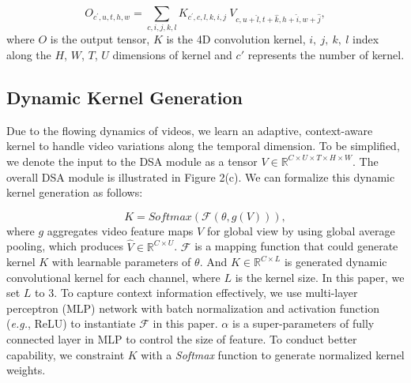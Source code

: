 \documentclass[sigconf]{acmart}
\begin{document}
\begin{equation}
O_{c^{\prime}, u, t, h, w}=\sum_{c, i, j, k,l} K_{c^{\prime}, c, l, k, i, j} \   V_{c, u+\hat{l}, t+\hat{k}, h+\hat{i}, w+\hat{j}},
\end{equation}
where $O$ is the output tensor, $K$ is the 4D convolution kernel, $i, \ j, \ k, \ l$ index along the $H$, $W$, $T$, $U$ dimensions of kernel and $c'$ represents the number of kernel.


\subsection{Dynamic Kernel Generation}
Due to the flowing dynamics of videos, we learn an adaptive, context-aware kernel to handle video variations along the temporal dimension.
To be simplified, we denote the input to the DSA module as a tensor $V \in \mathbb{R}^{ C \times U \times T \times H \times W}$.
The overall DSA module is illustrated in Figure 2(c).
We can formalize this dynamic kernel generation as follows:

\begin{equation}
    K = Softmax(\mathcal{F}(\theta, g(V))),
\end{equation}
where $g$ aggregates video feature maps $V$ for global view by using global average pooling, which produces ${\hat{V}} \in \mathbb{R}^{ C \times U}$.
$\mathcal{F}$ is a mapping function that could generate kernel $K$ with learnable parameters of $\theta$.
And $K \in \mathbb{R}^{C \times L} $ is generated dynamic convolutional kernel for each channel, where $L$ is the kernel size. In this paper, we set $L$ to 3.
To capture context information effectively, we use multi-layer perceptron (MLP) network with batch normalization and activation function (\emph{e.g.}, ReLU) to instantiate $\mathcal{F}$ in this paper.
$\alpha$ is a super-parameters of fully connected layer in MLP to control the size of feature.
To conduct better capability, we constraint $K$ with a \emph{Softmax} function to generate normalized kernel weights.

\newcommand{\blocks}[3]{\multirow{3}{*}{\(\left[\begin{array}{c}\text{1$\times$1$^\text{2}$, #2}\\[-.1em] \text{1$\times$3$^\text{2}$, #2}\\[-.1em] \text{1$\times$1$^\text{2}$, #1}\end{array}\right]\)$\times$#3}
	}
	\newcommand{\blockt}[3]{\multirow{3}{*}{\(\left[\begin{array}{c}\text{\underline{3$\times$1$^\text{2}$}, #2}\\[-.1em] \text{1$\times$3$^\text{2}$, #2}\\[-.1em] \text{1$\times$1$^\text{2}$, #1}\end{array}\right]\)$\times$#3}
	}
	
\end{document}
